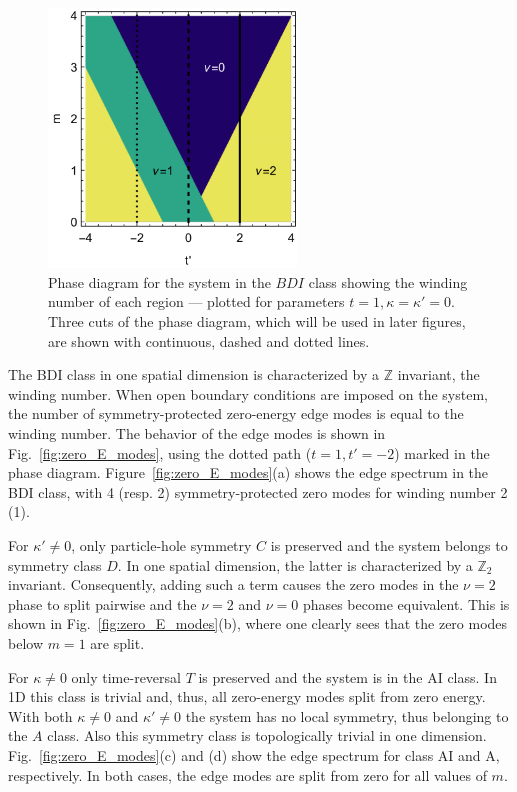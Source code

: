 \documentclass[twocolumn,amsmath,longbibliography,amssymb,superscriptaddress]{revtex4-1}
\begin{document}
\begin{figure}[t]
	\centering
	\includegraphics[width=66mm]{fig1.pdf}
	\caption{Phase diagram for the system in the $BDI$ class showing the winding number of each region --- plotted for parameters $t = 1,\kappa =\kappa'=0$. Three cuts of the phase diagram, which will be used in later figures,  are shown with continuous, dashed and dotted lines.}
\label{fig:bdi_phase_diagram}
\end{figure}

The BDI class  in one spatial dimension  is characterized by a $\mathbb{Z}$ invariant, the winding number.
When open boundary conditions are imposed on the system, the number of symmetry-protected zero-energy edge modes is equal to the winding number. 
The behavior of the  edge modes  is  shown in Fig.~\ref{fig:zero_E_modes}, using the dotted path ($t=1,t'=-2$) marked in the phase diagram. 
Figure~\ref{fig:zero_E_modes}(a) shows the edge spectrum in the BDI class, with 4 (resp. 2) symmetry-protected zero modes for winding number 2 (1). 

For $\kappa' \neq 0$, only particle-hole symmetry $C$ is preserved and the system belongs to symmetry class $D$. 
In one spatial dimension, the latter is characterized by a $\mathbb{Z}_2$ invariant.  
Consequently, adding such a term causes the zero modes in the $\nu=2$ phase to split  pairwise and the $\nu = 2$ and $\nu=0$ phases become equivalent. 
This is shown in Fig.~\ref{fig:zero_E_modes}(b), where one clearly sees that the zero modes below $m=1$ are split. 

For $\kappa \neq 0$ only time-reversal $T$ is preserved and the system is in the AI class. 
In 1D this class is trivial and, thus,  all zero-energy modes split from zero energy. 
With both $\kappa \neq 0$ and $\kappa' \neq0$ the system has no local symmetry, thus belonging to the $A$ class.  
Also this symmetry class is topologically trivial in one dimension. 
Fig.~\ref{fig:zero_E_modes}(c) and (d) show the edge spectrum for class AI and A, respectively. In both cases, the edge modes are split from zero for all values of $m$.
\end{document}
